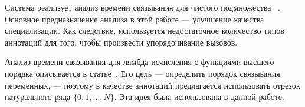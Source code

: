 Система \logen{} реализует анализ времени связывания для чистого подмножества \prolog{}~\cite{leuschel2004prolog}.
Основное предназначение анализа в этой работе --- улучшение качества специализации.
Как следствие, используется недостаточное количество типов аннотаций для того, чтобы произвести упорядочивание вызовов.

Анализ времени связывания для лямбда-исчисления с функциями высшего порядка описывается в статье~\cite{Thiemann1997AUF}.
Его цель --- определить порядок связывания переменных, --- поэтому в качестве аннотаций предлагается использовать отрезок натурального ряда $\{ 0, 1, \dots, N \}$.
Эта идея была использована в данной работе.
